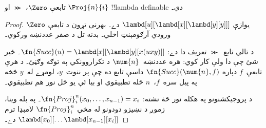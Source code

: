 \documentclass[../../../include/open-logic-section]{subfiles}
\begin{document}

\begin{lem}
تابعې $\Zero$، $\Succ$ او $\Proj{n}{i}$ !!{lambda definable} دي۔
\end{lem}

\begin{proof}
$\Zero$ يوازې $\lambd[u][\lambd[x][\lambd[y][y]]]$ دے۔
بهرنی تړون د تابعې ورودي آرګومېنټ اخلي۔ بدنه تل د صفر عددنښه ورکوي۔

د تالي تابع~$\Succ$ تعريف دا دے:
$\fn{Succ}(u) = \lambd[x][\lambd[y][x(uxy)]]$۔ ځير شئ چې دا
ولې کار کوي: هره عددنښه~$\num{n}$ د تکراروونکي په توګه وګڼئ۔ د
هرې تابعې~$f$ دپاره $\fn{Succ}(\num{n},f)$ داسې تابع ده چې پر
ننوت~$y$، لومړے له~$y$ څخه په پيل سره~$f$،~$n$ ځله تطبيقوي او
بيا ئې يو ځل نور هم تطبيقوي۔

د پروجيکشنونو په هکله نور څۀ نشته: $\fn{Proj}^n_i(x_0, \dots,
x_{n-1}) = x_i$۔ په بله وينا، زموږ د نښيزو دودونو له مخې
$\fn{Proj}^n_i$ لامبډا ترم
$\lambd[x_0][\dots \lambd[x_{n-1}][x_i]]$ دے۔
\end{proof}
\end{document}

